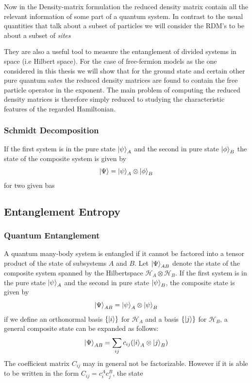 \documentclass[11pt, a4paper]{article}
\theoremstyle{definition} %
\begin{document}
	Now in the Density-matrix formulation the reduced density matrix contain all the relevant information of some part of a quantum system. In contrast to the usual quantities that talk about a subset of particles we will consider the RDM's to be about a subset of \textit{sites}
	
	
	
	They are also a useful tool to measure the entanglement of divided systems in space (i.e Hilbert space). For the case of free-fermion models as the one considered in this thesis we will show that for the ground state and certain other pure quantum sates the reduced density matrices are found to contain the free particle operator in the exponent. The main problem of computing the reduced density matrices is therefore simply reduced to studying the characteristic features of the regarded Hamiltonian.
	
	\subsubsection{Schmidt Decomposition}
	If the first system is in the pure state $\ket{\psi}_A$ and the second in pure state $\ket{\phi}_B$ the state of the composite system is given by
	\begin{equation}
		\ket{\Psi} = \ket{\psi}_A \otimes \ket{\phi}_B
	\end{equation}
	for two given bas

	
	
	\subsection{Entanglement Entropy}
	\subsubsection{Quantum Entanglement}
	A quantum many-body system is entangled if it cannot be factored into a tensor product of the state of subsystems $A$ and $B$. Let $\ket{\Psi}_{AB}$ denote the state of the composite system spanned by the Hilbertspace $\mathcal{H}_A \otimes \mathcal{H}_B$. If the first system is in the pure state $\ket{\psi}_A$ and the second in pure state $\ket{\psi}_B$, the composite state is given by
\begin{equation}
	\ket{\Psi}_{AB} = \ket{\psi}_A \otimes \ket{\psi}_B
\end{equation}
	if we define an orthonormal basis $\{\ket{i}\}$ for $\mathcal{H}_A$ and a basis $\{\ket{j}\}$ for $\mathcal{H}_B$, a general composite state can be expanded as follows:
	\begin{equation}
		\ket{\Psi}_{AB} = \sum_{ij} c_{ij}( \ket{i}_A \otimes \ket{j}_B)
	\end{equation}
	The coefficient matrix $C_{ij}$ may in general not be factorizable. However if it is able to be written in the form $C_{ij} = c_i^A c_j^B$, the state
	
\end{document}
